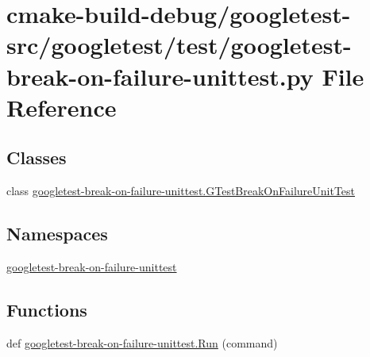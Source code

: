 \hypertarget{googletest-break-on-failure-unittest_8py}{}\section{cmake-\/build-\/debug/googletest-\/src/googletest/test/googletest-\/break-\/on-\/failure-\/unittest.py File Reference}
\label{googletest-break-on-failure-unittest_8py}
\subsection*{Classes}
\begin{DoxyCompactItemize}
\item 
class \mbox{\hyperlink{classgoogletest-break-on-failure-unittest_1_1GTestBreakOnFailureUnitTest}{googletest-\/break-\/on-\/failure-\/unittest.\+G\+Test\+Break\+On\+Failure\+Unit\+Test}}
\end{DoxyCompactItemize}
\subsection*{Namespaces}
\begin{DoxyCompactItemize}
\item 
 \mbox{\hyperlink{namespacegoogletest-break-on-failure-unittest}{googletest-\/break-\/on-\/failure-\/unittest}}
\end{DoxyCompactItemize}
\subsection*{Functions}
\begin{DoxyCompactItemize}
\item 
def \mbox{\hyperlink{namespacegoogletest-break-on-failure-unittest_a1af5bbcd251e90355ddcd17d0e0e6147}{googletest-\/break-\/on-\/failure-\/unittest.\+Run}} (command)
\end{DoxyCompactItemize}
